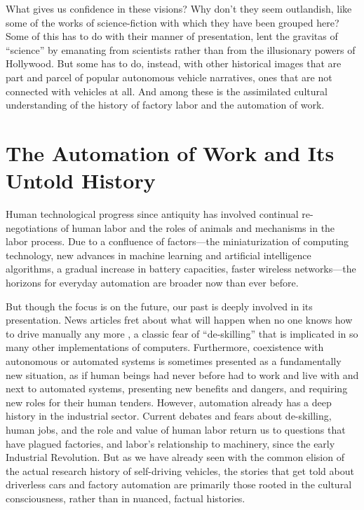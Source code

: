 What gives us confidence in these visions? Why don't they seem
outlandish, like some of the works of science-fiction with which they have
been grouped here? Some of this has to do with their manner of
presentation, lent the gravitas of ``science'' by emanating from
scientists rather than from the
illusionary powers of Hollywood. But some has to do, instead, with other historical images
that are part and parcel of
popular autonomous vehicle narratives, ones that are not connected
with vehicles at all. And among these is the assimilated cultural
understanding of the history of factory labor and the automation of
work.


\section{The Automation of Work and Its Untold History}

Human technological progress since antiquity has
involved continual re-negotiations of human labor and the roles of
animals and mechanisms in the labor process. Due to a confluence
of factors---the miniaturization of computing technology, new
advances in machine learning and artificial intelligence algorithms, a
gradual increase in battery capacities, faster wireless networks---the
horizons for everyday automation are broader now than ever before. 

But though the focus is on the future, our past is deeply involved
in its presentation. News articles fret
about what will happen when no one knows how to drive manually any
more \cite{pross}, a classic fear of ``de-skilling'' that is implicated in so many
other implementations of computers. Furthermore, coexistence with
autonomous or automated systems is sometimes presented as a fundamentally new
situation, as if human beings had never before had to work and live
with and next to automated systems, presenting new benefits and
dangers, and requiring new roles for their human tenders. However,
automation already has a deep 
history in the industrial sector. Current debates and fears about de-skilling, human jobs,
and the role and value of human labor return us to questions that have
plagued factories, and labor's relationship to machinery, since the
early Industrial Revolution. But as we have already seen with the common
elision of the actual research history of self-driving vehicles, the
stories that get told about driverless cars and factory automation are
primarily those rooted in the cultural consciousness, rather than in
nuanced, factual histories.

